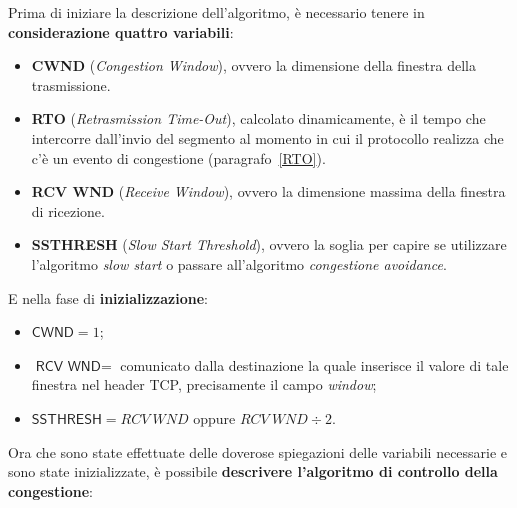 \documentclass[a4paper]{article}
\begin{document}
	\noindent
	Prima di iniziare la descrizione dell'algoritmo, è necessario tenere in \textbf{considerazione quattro variabili}:
	\begin{itemize}
		\item \textbf{\textsf{CWND}} (\emph{Congestion Window}), ovvero la dimensione della finestra della trasmissione.
		
		\item \textbf{\textsf{RTO}} (\emph{Retrasmission Time-Out}), calcolato dinamicamente, è il tempo che intercorre dall'invio del segmento al momento in cui il protocollo realizza che c'è un evento di congestione (paragrafo~\ref{RTO}).
		
		\item \textbf{\textsf{RCV WND}} (\emph{Receive Window}), ovvero la dimensione massima della finestra di ricezione.
		
		\item \textbf{\textsf{SSTHRESH}} (\emph{Slow Start Threshold}), ovvero la soglia per capire se utilizzare l'algoritmo \emph{slow start} o passare all'algoritmo \emph{congestione avoidance}.
	\end{itemize}
	E nella fase di \textbf{inizializzazione}:
	\begin{itemize}[label=-]
		\item $\textsf{CWND} = 1$;

		\item $\textsf{RCV WND} = $ comunicato dalla destinazione la quale inserisce il valore di tale finestra nel header TCP, precisamente il campo \emph{window};
		
		\item $\textsf{SSTHRESH} = RCV\:WND$ oppure $RCV\:WND \div 2$.
	\end{itemize}
	\newpage\noindent
	Ora che sono state effettuate delle doverose spiegazioni delle variabili necessarie e sono state inizializzate, è possibile \textcolor{Red3}{\textbf{descrivere l'algoritmo di controllo della congestione}}:
\end{document}
